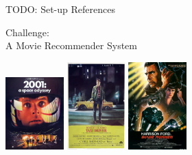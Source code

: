\documentclass[xcolor=svgnames]{beamer}
\newcommand{\introframe}[2]{
    \begin{frame}
	   \vfill
	   \hfill\Huge{#1}
	   
	   \vspace{1em}
	   
	   \hfill\Large{#2}
	   \vfill
    \end{frame}
}
\begin{document}
    \begin{frame}
    	TODO: Set-up References
    \end{frame}     
            
    \introframe{Challenge:\\ \hfill \Large{A Movie Recommender System}}{ 
        \includegraphics[width=85px]{fig/2001-poster}
        \hfill
        \includegraphics[width=85px]{fig/taxidriverposter}
        \hfill
        \includegraphics[width=85px]{fig/blade_runner}}
        
\end{document}
